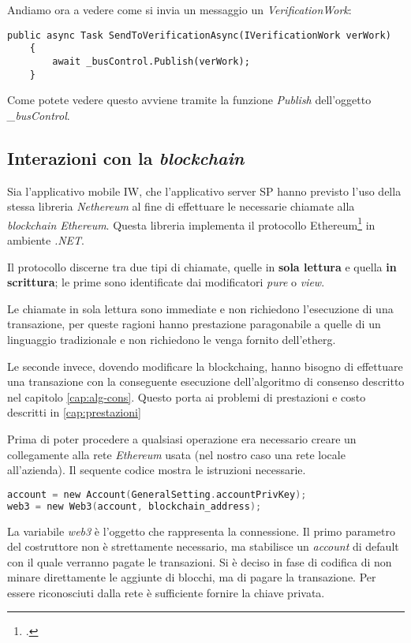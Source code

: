 Andiamo ora a vedere come si invia un messaggio un \emph{VerificationWork}:
\begin{lstlisting}[caption={codice invio di un messaggio}]
    public async Task SendToVerificationAsync(IVerificationWork verWork)
    {
        await _busControl.Publish(verWork);
    }
\end{lstlisting}

Come potete vedere questo avviene tramite la funzione \emph{Publish} dell'oggetto \emph{\_busControl}.

\subsection{Interazioni con la \emph{blockchain}}

Sia l'applicativo mobile IW, che l'applicativo server SP hanno previsto l'uso della stessa libreria \emph{Nethereum} al fine di effettuare le necessarie chiamate alla \emph{blockchain Ethereum}.
Questa libreria implementa il protocollo Ethereum\footcite{site:ethereum-yellow-paper} in ambiente \emph{.NET}.

Il protocollo discerne tra due tipi di chiamate, quelle in \textbf{sola lettura} e quella \textbf{in scrittura}; le prime sono identificate dai modificatori \emph{pure} o \emph{view}.

Le chiamate in sola lettura sono immediate e non richiedono l'esecuzione di una transazione, per queste ragioni hanno prestazione paragonabile a quelle di un linguaggio tradizionale e non richiedono le venga fornito dell'\gls{etherg}.

Le seconde invece, dovendo modificare la \gls{blockchaing}, hanno bisogno di effettuare una transazione con la conseguente esecuzione dell'algoritmo di consenso descritto nel capitolo \ref{cap:alg-cons}. Questo porta ai problemi di prestazioni e costo descritti in \ref{cap:prestazioni}

Prima di poter procedere a qualsiasi operazione era necessario creare un collegamente alla rete \emph{Ethereum} usata (nel nostro caso una rete locale all'azienda). Il sequente codice mostra le istruzioni necessarie.

\begin{lstlisting}[caption={Connessione alla rete di test},label={lst:connessione},language={C}]
account = new Account(GeneralSetting.accountPrivKey);
web3 = new Web3(account, blockchain_address);
\end{lstlisting}

La variabile \emph{web3} è l'oggetto che rappresenta la connessione. Il primo parametro del costruttore non è strettamente necessario, ma stabilisce un \emph{account} di default con il quale verranno pagate le transazioni. Si è deciso in fase di codifica di non minare direttamente le aggiunte di blocchi, ma di pagare la transazione. Per essere riconosciuti dalla rete è sufficiente fornire la chiave privata. 
\medskip

